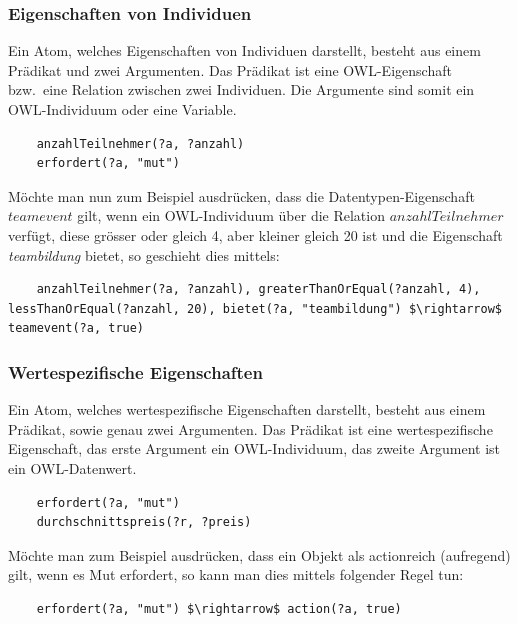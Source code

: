 \subsubsection{Eigenschaften von Individuen}
\label{ssubsec:swrl_aufbau_atomaretypen_eigenschaftenvonindividuen}
Ein Atom, welches Eigenschaften von Individuen darstellt, besteht aus einem Prädikat und zwei Argumenten. Das Prädikat ist eine OWL-Eigenschaft bzw.\ eine Relation zwischen zwei Individuen. Die Argumente sind somit ein OWL-Individuum oder eine Variable.
\lstset{language=XML}
\begin{lstlisting}
    anzahlTeilnehmer(?a, ?anzahl)
    erfordert(?a, "mut")
\end{lstlisting}

\newpage

Möchte man nun zum Beispiel ausdrücken, dass die Datentypen-Eigenschaft $ teamevent $ gilt, wenn ein OWL-Individuum über die Relation $ anzahlTeilnehmer $ verfügt, diese grösser oder gleich 4, aber kleiner gleich 20 ist und die Eigenschaft \textit{teambildung} bietet, so geschieht dies mittels:
\lstset{language=XML}
\begin{lstlisting}
    anzahlTeilnehmer(?a, ?anzahl), greaterThanOrEqual(?anzahl, 4), lessThanOrEqual(?anzahl, 20), bietet(?a, "teambildung") $\rightarrow$ teamevent(?a, true)
\end{lstlisting}

\subsubsection{Wertespezifische Eigenschaften}
\label{ssubsec:swrl_aufbau_atomaretypen_wertespezifischeeigenschaften}
Ein Atom, welches wertespezifische Eigenschaften darstellt, besteht aus einem Prädikat, sowie genau zwei Argumenten. Das Prädikat ist eine wertespezifische Eigenschaft, das erste Argument ein OWL-Individuum, das zweite Argument ist ein OWL-Datenwert.
\lstset{language=XML}
\begin{lstlisting}
    erfordert(?a, "mut")
    durchschnittspreis(?r, ?preis)
\end{lstlisting}

Möchte man zum Beispiel ausdrücken, dass ein Objekt als actionreich (aufregend) gilt, wenn es Mut erfordert, so kann man dies mittels folgender Regel tun:
\lstset{language=XML}
\begin{lstlisting}
    erfordert(?a, "mut") $\rightarrow$ action(?a, true)
\end{lstlisting}

